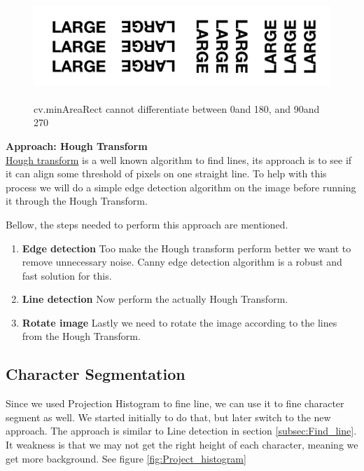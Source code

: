 \documentclass[Report.tex]{subfiles}
\begin{document}
\begin{flushleft}
    \begin{figure}[H]
      \centering
      \includegraphics[height=4cm]{res/4angle_rot.png}
      \caption{cv.minAreaRect cannot differentiate between 0\textdegree and 180\textdegree, and 90\textdegree and 270\textdegree}
      \label{fig:4angle_rot}
    \end{figure}

\end{flushleft}


\begin{flushleft}
  \textbf{Approach: Hough Transform} \\
  \href{https://en.wikipedia.org/wiki/Hough_transform}{Hough transform} is a well known algorithm to find lines, its approach is to see if it can align some threshold of pixels on one straight line. To help with this process we will do a simple edge detection algorithm on the image before running it through the Hough Transform. \par Bellow, the steps needed to perform this approach are mentioned.

  \begin{enumerate}
    \item \textbf{Edge detection}
    Too make the Hough transform perform better we want to remove unnecessary noise. Canny edge detection algorithm is a robust and fast solution for this.
    \item \textbf{Line detection}
    Now perform the actually Hough Transform.
    \item \textbf{Rotate image}
    Lastly we need to rotate the image according to the lines from the Hough Transform.
  \end{enumerate}
\end{flushleft}

\subsection{Character Segmentation}
Since we used Projection Histogram to fine line, we can use it to fine character segment as well. We started initially to do that, but later switch to the new approach. The approach is similar to Line detection in section \ref{subsec:Find_line}. It weakness is that we may not get the right height of each character, meaning we get more background. See figure \ref{fig:Project_histogram}
\end{document}
